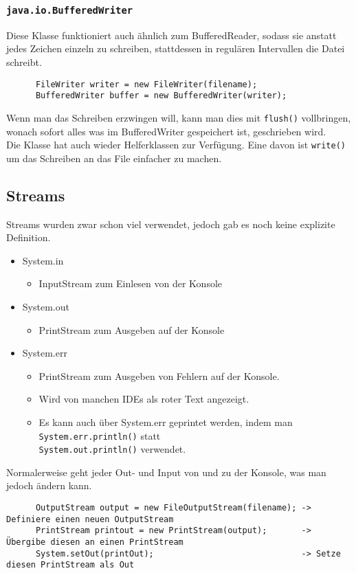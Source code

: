 \documentclass{article}
\begin{document}
	  \subsubsection{\texorpdfstring{\texttt{java.io.BufferedWriter}}{java.io.BufferedWriter}}
	  Diese Klasse funktioniert auch ähnlich zum BufferedReader, sodass sie anstatt jedes Zeichen einzeln zu schreiben, stattdessen in regulären Intervallen die Datei schreibt. 
	  \begin{verbatim}
	  FileWriter writer = new FileWriter(filename);
	  BufferedWriter buffer = new BufferedWriter(writer);
	  \end{verbatim}
	  Wenn man das Schreiben erzwingen will, kann man dies mit \verb|flush()| vollbringen, wonach sofort alles was im BufferedWriter gespeichert ist, geschrieben wird. \\
	  Die Klasse hat auch wieder Helferklassen zur Verfügung. Eine davon ist \verb|write()| um das Schreiben an das File einfacher zu machen.  
	  \subsection{Streams}
	  Streams wurden zwar schon viel verwendet, jedoch gab es noch keine explizite Definition.
	  \begin{itemize}
	  	\item{System.in}
	  	\begin{itemize}
	  		\item{InputStream zum Einlesen von der Konsole}
	  	\end{itemize}
	  	\item{System.out}
	  	\begin{itemize}
	  		\item{PrintStream zum Ausgeben auf der Konsole}
	  	\end{itemize}
	  	\item{System.err}
	  	\begin{itemize}
	  		\item{PrintStream zum Ausgeben von Fehlern auf der Konsole.}
	  		\item{Wird von manchen IDEs als roter Text angezeigt.}
	  		\item{Es kann auch über System.err geprintet werden, indem man \verb|System.err.println()| statt\\ \verb|System.out.println()| verwendet.}
	  	\end{itemize}
	  \end{itemize}
	  Normalerweise geht jeder Out- und Input von und zu der Konsole, was man jedoch ändern kann.
	  \begin{verbatim}
	  OutputStream output = new FileOutputStream(filename); -> Definiere einen neuen OutputStream
	  PrintStream printout = new PrintStream(output);       -> Übergibe diesen an einen PrintStream
	  System.setOut(printOut);                              -> Setze diesen PrintStream als Out
	  \end{verbatim}
\end{document}

